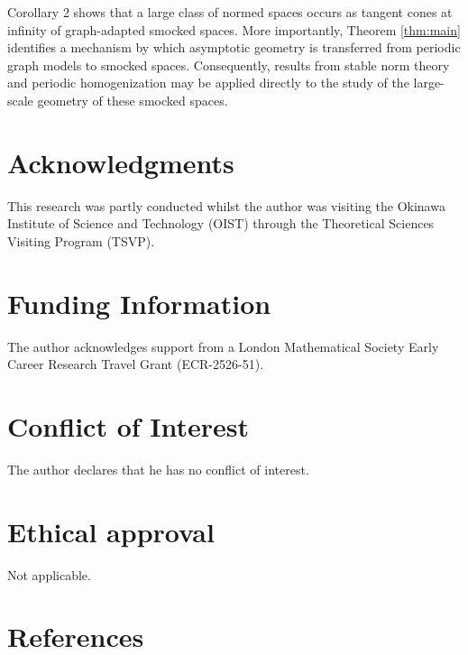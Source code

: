 \documentclass[12pt, letterpaper]{article}
\begin{document}
\noindent
Corollary 2 shows that a large class of normed spaces occurs as tangent cones at infinity of graph-adapted smocked spaces. More importantly, Theorem \ref{thm:main} identifies a mechanism by which asymptotic geometry is transferred from periodic graph models to smocked spaces. Consequently, results from stable norm theory and periodic homogenization may be applied directly to the study of the large-scale geometry of these smocked spaces.










 







 

\noindent
 

\section*{Acknowledgments} This research was partly conducted whilst the author was visiting the Okinawa Institute of Science and 
Technology (OIST) through the Theoretical Sciences Visiting Program (TSVP).

\section*{Funding Information} The author acknowledges support from a London Mathematical Society Early Career Research Travel Grant (ECR-2526-51).      

\section*{Conflict of Interest} The author declares that he has no conflict of interest.

\section*{Ethical approval} Not applicable.







\section*{References}
\end{document}
